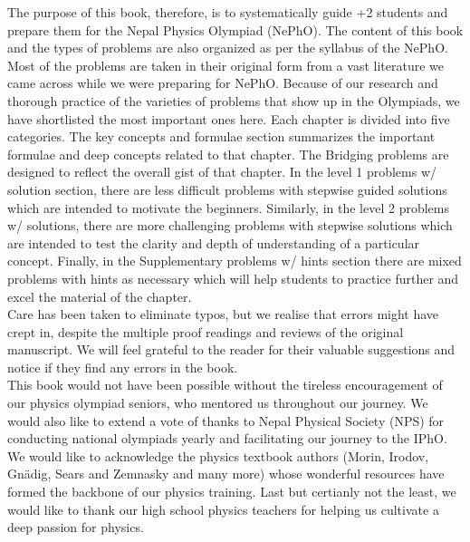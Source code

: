 \hspace{1cm} The purpose of this book, therefore, is to systematically guide +2 students and prepare them for the Nepal Physics Olympiad (NePhO). The content of this book and the types of problems are also organized as per the syllabus of the NePhO. Most of the problems are taken in their original form from a vast literature we came across while we were preparing for NePhO. Because of our research and thorough practice of the varieties of problems that show up in the Olympiads, we have shortlisted the most important ones here. Each chapter is divided into five categories. The key concepts and formulae section summarizes the important formulae and deep concepts related to that chapter. The Bridging problems are designed to reflect the overall gist of that chapter. In the level 1 problems w/ solution section, there are less difficult problems with stepwise guided solutions which are intended to motivate the beginners. Similarly, in the level 2 problems w/ solutions, there are more challenging problems with stepwise solutions which are intended to test the clarity and depth of understanding of a particular concept. Finally, in the Supplementary problems w/ hints section there are mixed problems with hints as necessary which will help students to practice further and excel the material of the chapter.\\

\hspace{1 cm} Care has been taken to eliminate typos, but we realise that errors might have crept in, despite the multiple proof readings and reviews of the original manuscript. We will feel grateful to the reader for their valuable suggestions and notice if they find any errors in the book.\\

\hspace{1cm} This book would not have been possible without the tireless encouragement of our physics olympiad seniors, who mentored us throughout our journey. We would also like to extend a vote of thanks to Nepal Physical Society (NPS) for conducting national olympiads yearly and facilitating our journey to the IPhO. We would like to acknowledge the physics textbook authors (Morin, Irodov, Gn\"adig, Sears and Zemnasky and many more) whose wonderful resources have formed the backbone of our physics training. Last but certianly not the least, we would like to thank our high school physics teachers for helping us cultivate a deep passion for physics.
